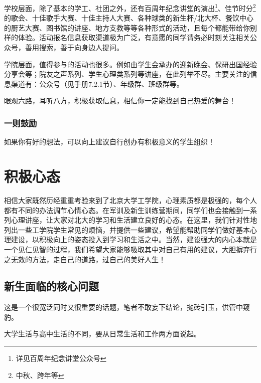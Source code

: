 \documentclass[11pt,oneside]{book}
\begin{document}
\vspace{10pt}

学校层面，除了基本的学工、社团之外，还有百周年纪念讲堂的演出\footnote{详见百周年纪念讲堂公众号}、佳节时分\footnote{中秋、跨年等}的歌会、十佳歌手大赛、十佳主持人大赛、各种球类的新生杯/北大杯、餐饮中心的厨艺大赛、图书馆的讲座、地方支教等等各种形式的活动，且每个都能带给你别样的体验。活动报名信息获取渠道极为广泛，有意愿的同学请务必时刻关注相关公众号，善用搜索，善于向身边人提问。

\vspace{10pt}

学院层面，值得参与的活动也很多。例如由学生会承办的迎新晚会、保研出国经验分享会等；院友之声系列、学生心理类系列等讲座，在此列举不尽。主要关注的信息渠道有：公众号（见手册7.2.1节）、年级群、班级群等。

\vspace{10pt}

眼观六路，耳听八方，积极获取信息，相信你一定能找到自己热爱的舞台！

\subsection{一则鼓励}
如果你有好的想法，可以向上建议自行创办有积极意义的学生组织！

\chapter{积极心态}
相信大家既然历经重重考验来到了北京大学工学院，心理素质都是极强的，每个人都有不同的办法调节心情心态。在军训及新生训练营期间，同学们也会接触到一系列心理讲座，让大家对北大的学习和生活建立良好的心态。在这里，我们针对性地列出一些工学院学生常见的烦恼，并提供一些建议，希望能帮助同学们做好基本心理建设，以积极向上的姿态投入到学习和生活之中。当然，建设强大的内心本就是一个见仁见智的过程，我们希望大家能够吸取其中对自己有用的建议，大胆摒弃行之无效的方法，走自己的道路，过自己的美好人生！

\section{新生面临的核心问题}
这是一个很宽泛同时又很重要的话题，笔者不敢妄下结论，抛砖引玉，供管中窥豹。

\vspace{10pt}

大学生活与高中生活的不同，要从日常生活和工作两方面说起。

\vspace{10pt}
\end{document}
